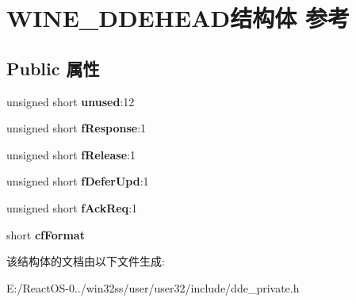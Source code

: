 \hypertarget{struct_w_i_n_e___d_d_e_h_e_a_d}{}\section{W\+I\+N\+E\+\_\+\+D\+D\+E\+H\+E\+A\+D结构体 参考}
\label{struct_w_i_n_e___d_d_e_h_e_a_d}
\subsection*{Public 属性}
\begin{DoxyCompactItemize}
\item 
\mbox{\label{struct_w_i_n_e___d_d_e_h_e_a_d_a86fa0daa0b71509147fd7aa0f1b59cb9}} 
unsigned short {\bfseries unused}\+:12
\item 
\mbox{\label{struct_w_i_n_e___d_d_e_h_e_a_d_ac890b3994e7a5ad6f198c09cf552d9df}} 
unsigned short {\bfseries f\+Response}\+:1
\item 
\mbox{\label{struct_w_i_n_e___d_d_e_h_e_a_d_a8fcaf5f1d39f160ae0958bc6710b27df}} 
unsigned short {\bfseries f\+Release}\+:1
\item 
\mbox{\label{struct_w_i_n_e___d_d_e_h_e_a_d_ade33587afc18379cbca8718c811ebe9b}} 
unsigned short {\bfseries f\+Defer\+Upd}\+:1
\item 
\mbox{\label{struct_w_i_n_e___d_d_e_h_e_a_d_adb8294e52681aa973abf44ab39c47579}} 
unsigned short {\bfseries f\+Ack\+Req}\+:1
\item 
\mbox{\label{struct_w_i_n_e___d_d_e_h_e_a_d_adf60402dc86747ff43bb3e8c6a9ae455}} 
short {\bfseries cf\+Format}
\end{DoxyCompactItemize}


该结构体的文档由以下文件生成\+:\begin{DoxyCompactItemize}
\item 
E\+:/\+React\+O\+S-\/0../win32ss/user/user32/include/dde\+\_\+private.\+h\end{DoxyCompactItemize}
